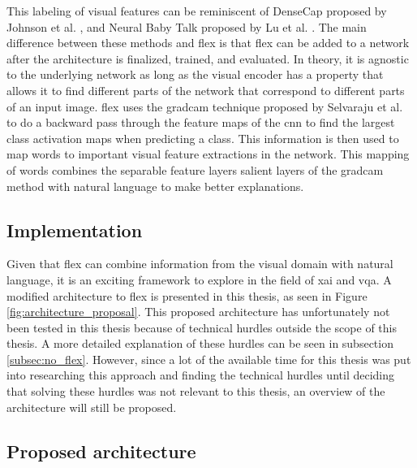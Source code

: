    
        This labeling of visual features can be reminiscent of DenseCap proposed by Johnson et al. \cite{johnsonDenseCapFullyConvolutional2016}, and Neural Baby Talk proposed by Lu et al. \cite{luNeuralBabyTalk2018}. The main difference between these methods and \gls{flex} is that \gls{flex} can be added to a network after the architecture is finalized, trained, and evaluated. In theory, it is agnostic to the underlying network as long as the visual encoder has a property that allows it to find different parts of the network that correspond to different parts of an input image. \gls{flex} uses the \gls{gradcam} technique proposed by Selvaraju et al. \cite{selvarajuGradCAMVisualExplanations2020} to do a backward pass through the feature maps of the \gls{cnn} to find the largest class activation maps when predicting a class. This information is then used to map words to important visual feature extractions in the network. This mapping of words combines the separable feature layers salient layers of the \gls{gradcam} method with natural language to make better explanations.


        \subsection{Implementation}
        Given that \gls{flex} can combine information from the visual domain with natural language, it is an exciting framework to explore in the field of \gls{xai} and \gls{vqa}. A modified architecture to \gls{flex} is presented in this thesis, as seen in Figure \ref{fig:architecture_proposal}. This proposed architecture has unfortunately not been tested in this thesis because of technical hurdles outside the scope of this thesis. A more detailed explanation of these hurdles can be seen in subsection \ref{subsec:no_flex}. However, since a lot of the available time for this thesis was put into researching this approach and finding the technical hurdles until deciding that solving these hurdles was not relevant to this thesis, an overview of the architecture will still be proposed. 

       

        \subsection{Proposed architecture}
        \label{sec3:proposed_architecture}
        
